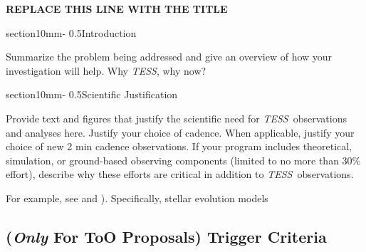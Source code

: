 \documentclass[letterpaper,11pt]{article}
\makeatletter
\renewcommand{\section}{\@startsection%
{section}{1}{0mm}{-\baselineskip}%
{0.5\baselineskip}{\normalfont\Large\bfseries}}%
\newcommand{\tess}{{\it TESS}}
\makeatother
\begin{document}
\pagestyle{plain}




\begin{center}
\bfseries\uppercase{%
REPLACE THIS LINE WITH THE TITLE
}
\end{center}






\section{Introduction}

Summarize the problem being addressed and give an overview of how your investigation will help.
Why \tess, why now?


\section{Scientific Justification}

Provide text and figures that justify the scientific need for \tess\ observations and analyses here.
Justify your choice of cadence. When applicable, justify your choice of new 2 min cadence observations.
If your program includes theoretical, simulation, or ground-based observing components (limited to no
more than 30\% effort), describe why these efforts are critical in addition to \tess\ observations.

For example, see \cite{2015ApJ...807..174S} and \cite{2015arXiv150706460F}).  Specifically, stellar evolution models



\subsection{({\it Only} For ToO Proposals) Trigger Criteria}
\end{document}
